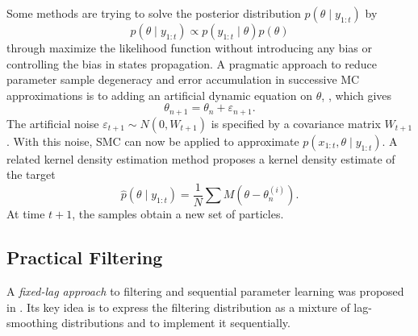 Some methods are trying to solve the posterior distribution $p(\theta \mid y_{1:t})$ by 
\begin{equation}
p(\theta \mid y_{1:t}) \propto p(y_{1:t} \mid \theta ) p(\theta )
\end{equation}
through maximize the likelihood function without introducing any bias or controlling the bias in states propagation. A pragmatic approach to reduce parameter sample degeneracy and error accumulation in successive MC approximations is to adding an artificial dynamic equation on $\theta$, \citep{higuchi2001self, kitagawa1998self}, which gives
\begin{equation}
\theta_{n+1} = \theta_n+\varepsilon_{n+1}.
\end{equation}
The artificial noise $\varepsilon_{t+1}\sim N(0,W_{t+1})$ is specified by a covariance matrix $W_{t+1}$. With this noise, SMC can now be applied to approximate $p(x_{1:t},\theta\mid y_{1:t})$. A related kernel density estimation method proposes a kernel density estimate of the target \citep{liu2001combined} 
\begin{equation}
\hat{p}(\theta\mid y_{1:t}) = \frac{1}{N}\sum M\left(\theta-\theta_n^{(i)}\right). 
\end{equation} 
At time $t+1$, the samples obtain a new set of particles. 


\subsection{Practical Filtering}

A \textit{fixed-lag approach} to filtering and sequential parameter learning was proposed in \citep{polson2008practical}. Its key idea is to express the filtering distribution as a mixture of lag-smoothing distributions and to implement it sequentially. 

